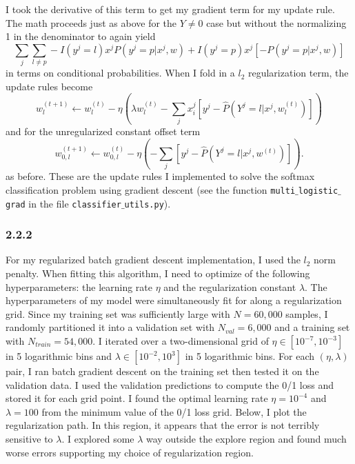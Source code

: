 \documentclass[12pt]{amsart}
\begin{document}
I took the derivative of this term to get my gradient term for my update rule.  The math proceeds just as above for the $Y \neq 0$ case but without the normalizing 1 in the denominator to again yield
\begin{equation}
\sum_j \sum_{l \neq p} -I(y^j = l) x^j P(y^j = p | x^j, w) + I(y^j = p) x^j \left[- P(y^j = p | x^j, w) \right]
\end{equation}
in terms on conditional probabilities.  When I fold in a $l_2$ regularization term, the update rules become
 \begin{equation}
w^{(t+1)}_l \leftarrow w^{(t)}_l - \eta (\lambda w^{(t)}_l - \sum_j x^j_i[y^j - \hat{P}(Y^j = l | x^j, w_l^{(t)})])
\end{equation}
and for the unregularized constant offset term
\begin{equation}
w^{(t+1)}_{0,l} \leftarrow w^{(t)}_{0,l} - \eta (- \sum_j[y^j - \hat{P}(Y^j = l | x^j, w^{(t)})]).
\end{equation}
as before.  These are the update rules I implemented to solve the softmax classification problem using gradient descent (see the function {\tt multi$\_$logistic$\_$grad} in the file {\tt classifier$\_$utils.py}).

\subsubsection*{2.2.2}

For my regularized batch gradient descent implementation, I used the $l_2$ norm penalty.  When fitting this algorithm, I need to optimize of the following hyperparameters: the learning rate $\eta$ and the regularization constant $\lambda$.  The hyperparameters of my model were simultaneously fit for along a regularization grid.  Since my training set was sufficiently large with $N = 60,000$ samples, I randomly partitioned it into a validation set with $N_{val} = 6,000$ and a training set with $N_{train} = 54,000$.  I iterated over a two-dimensional grid of $\eta \in [10^{-7},10^{-3}]$ in 5 logarithmic bins and $\lambda \in [10^{-2},10^{3}]$ in 5 logarithmic bins.  For each $(\eta,\lambda)$ pair, I ran batch gradient descent on the training set then tested it on the validation data.  I used the validation predictions to compute the 0/1 loss and stored it for each grid point.  I found the optimal learning rate $\eta = 10^{-4}$ and $\lambda = 100$ from the minimum value of the 0/1 loss grid.  Below, I plot the regularization path.  In this region, it appears that the error is not terribly sensitive to $\lambda$.  I explored some $\lambda$ way outside the explore region and found much worse errors supporting my choice of regularization region.
\end{document}
